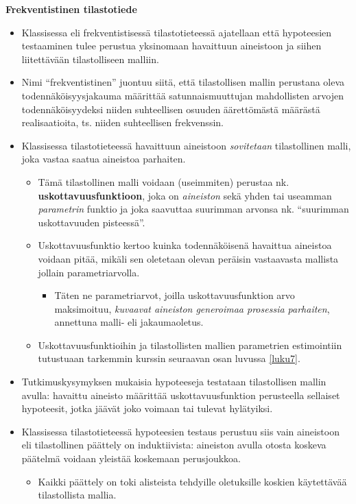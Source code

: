 \documentclass[
]{book}
\providecommand{\tightlist}{%
  \setlength{\itemsep}{0pt}\setlength{\parskip}{0pt}}
\begin{document}
\hfill\break

\textbf{Frekventistinen tilastotiede}

\begin{itemize}
\item
  Klassisessa eli frekventistisessä tilastotieteessä ajatellaan että hypoteesien testaaminen tulee perustua yksinomaan havaittuun aineistoon ja siihen liitettävään tilastolliseen malliin.
\item
  Nimi ``frekventistinen'' juontuu siitä, että tilastollisen mallin perustana oleva todennäköisyysjakauma määrittää satunnaismuuttujan mahdollisten arvojen todennäköisyydeksi niiden suhteellisen osuuden äärettömästä määrästä realisaatioita, ts. niiden suhteellisen frekvenssin.
\item
  Klassisessa tilastotieteessä havaittuun aineistoon \emph{sovitetaan} tilastollinen malli, joka vastaa saatua aineistoa parhaiten.

  \begin{itemize}
  \tightlist
  \item
    Tämä tilastollinen malli voidaan (useimmiten) perustaa nk. \textbf{uskottavuusfunktioon}, joka on \emph{aineiston} sekä yhden tai useamman \emph{parametrin} funktio ja joka saavuttaa suurimman arvonsa nk. ``suurimman uskottavuuden pisteessä''.
  \item
    Uskottavuusfunktio kertoo kuinka todennäköisenä havaittua aineistoa voidaan pitää, mikäli sen oletetaan olevan peräisin vastaavasta mallista jollain parametriarvolla.

    \begin{itemize}
    \tightlist
    \item
      Täten ne parametriarvot, joilla uskottavuusfunktion arvo maksimoituu, \emph{kuvaavat aineiston generoimaa prosessia parhaiten}, annettuna malli- eli jakaumaoletus.
    \end{itemize}
  \item
    Uskottavuusfunktioihin ja tilastollisten mallien parametrien estimointiin tutustuaan tarkemmin kurssin seuraavan osan luvussa \ref{luku7}.
  \end{itemize}
\item
  Tutkimuskysymyksen mukaisia hypoteeseja testataan tilastollisen mallin avulla: havaittu aineisto määrittää uskottavuusfunktion perusteella sellaiset hypoteesit, jotka jäävät joko voimaan tai tulevat hylätyiksi.
\item
  Klassisessa tilastotieteessä hypoteesien testaus perustuu siis vain aineistoon eli tilastollinen päättely on induktiivista: aineiston avulla otosta koskeva päätelmä voidaan yleistää koskemaan perusjoukkoa.

  \begin{itemize}
  \tightlist
  \item
    Kaikki päättely on toki alisteista tehdyille oletuksille koskien käytettävää tilastollista mallia.
  \end{itemize}
\end{itemize}
\end{document}
